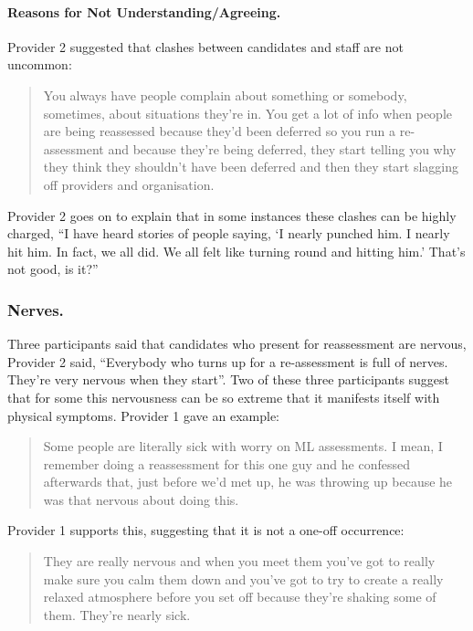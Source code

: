 \documentclass[
  12pt,
  a4paper,
]{book}
\begin{document}
\hypertarget{reasons-for-not-understandingagreeing.}{%
\paragraph{Reasons for Not Understanding/Agreeing.}\label{reasons-for-not-understandingagreeing.}}

Provider 2 suggested that clashes between candidates and staff are not uncommon:

\begin{quote}
You always have people complain about something or somebody, sometimes, about situations they're in. You get a lot of info when people are being reassessed because they'd been deferred so you run a re-assessment and because they're being deferred, they start telling you why they think they shouldn't have been deferred and then they start slagging off providers and organisation.
\end{quote}

Provider 2 goes on to explain that in some instances these clashes can be highly charged, ``I have heard stories of people saying, `I nearly punched him. I nearly hit him. In fact, we all did. We all felt like turning round and hitting him.' That's not good, is it?''

\hypertarget{nerves.}{%
\subsubsection{Nerves.}\label{nerves.}}

Three participants said that candidates who present for reassessment are nervous, Provider 2 said, ``Everybody who turns up for a re-assessment is full of nerves. They're very nervous when they start''. Two of these three participants suggest that for some this nervousness can be so extreme that it manifests itself with physical symptoms. Provider 1 gave an example:

\begin{quote}
Some people are literally sick with worry on ML assessments. I mean, I remember doing a reassessment for this one guy and he confessed afterwards that, just before we'd met up, he was throwing up because he was that nervous about doing this.
\end{quote}

Provider 1 supports this, suggesting that it is not a one-off occurrence:

\begin{quote}
They are really nervous and when you meet them you've got to really make sure you calm them down and you've got to try to create a really relaxed atmosphere before you set off because they're shaking some of them. They're nearly sick.
\end{quote}
\end{document}
